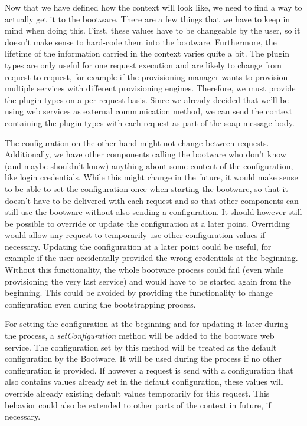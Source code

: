 Now that we have defined how the context will look like, we need to find a way to actually get it to the bootware.
There are a few things that we have to keep in mind when doing this.
First, these values have to be changeable by the user, so it doesn't make sense to hard-code them into the bootware.
Furthermore, the lifetime of the information carried in the context varies quite a bit.
The plugin types are only useful for one request execution and are likely to change from request to request, for example if the provisioning manager wants to provision multiple services with different provisioning engines.
Therefore, we must provide the plugin types on a per request basis.
Since we already decided that we'll be using web services as external communication method, we can send the context containing the plugin types with each request as part of the soap message body.

The configuration on the other hand might not change between requests.
Additionally, we have other components calling the bootware who don't know (and maybe shouldn't know) anything about some content of the configuration, like login credentials.
While this might change in the future, it would make sense to be able to set the configuration once when starting the bootware, so that it doesn't have to be delivered with each request and so that other components can still use the bootware without also sending a configuration.
It should however still be possible to override or update the configuration at a later point.
Overriding would allow any request to temporarily use other configuration values if necessary.
Updating the configuration at a later point could be useful, for example if the user accidentally provided the wrong credentials at the beginning.
Without this functionality, the whole bootware process could fail (even while provisioning the very last service) and would have to be started again from the beginning.
This could be avoided by providing the functionality to change configuration even during the bootstrapping process.

For setting the configuration at the beginning and for updating it later during the process, a \textit{setConfiguration} method will be added to the bootware web service.
The configuration set by this method will be treated as the default configuration by the Bootware.
It will be used during the process if no other configuration is provided.
If however a request is send with a configuration that also contains values already set in the default configuration, these values will override already existing default values temporarily for this request.
This behavior could also be extended to other parts of the context in future, if necessary.
